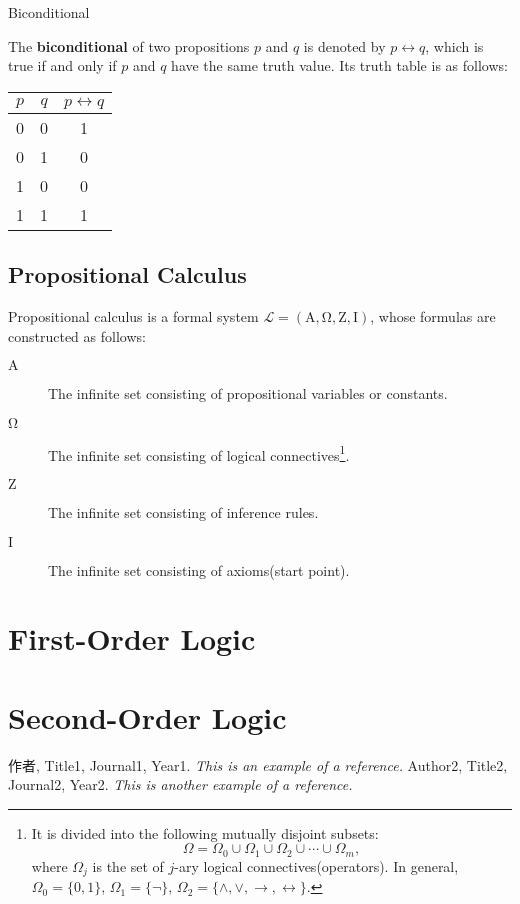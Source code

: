 \documentclass[11pt]{elegantbook}
\begin{document}
\begin{leftbarTitle}{Biconditional}\end{leftbarTitle}
The \textbf{biconditional} of two propositions \(p\) and \(q\) is denoted by \(p \leftrightarrow q\),
which is true if and only if \(p\) and \(q\) have the same truth value.
Its truth table is as follows:
\begin{center}
\begin{tabular}{ccc}
\toprule
$p$ & $q$ & $p \leftrightarrow q$ \\ %
\midrule
0 & 0 & 1 \\ %
0 & 1 & 0 \\ %
1 & 0 & 0 \\ %
1 & 1 & 1 \\ %
\bottomrule
\end{tabular}
\end{center}

\section{Propositional Calculus}
Propositional calculus is a formal system \(\mathcal{L} = \left( \mathrm{A}, \mathrm{\Omega}, \mathrm{Z}, \mathrm{I} \right) \),
whose formulas are constructed as follows:
\begin{description}
    \item[\({\mathrm{A}}\)]  The infinite set consisting of propositional variables or constants.
    \item[\({\mathrm{\Omega}}\)]  The infinite set consisting of logical connectives\footnote{
        It is divided into the following mutually disjoint subsets:
        \[
        \Omega = \Omega_{0} \cup \Omega_{1} \cup \Omega_{2} \cup \cdots \cup \Omega_{m},
        \]
        where \(\Omega_{j}\) is the set of \(j\)-ary logical connectives(operators).
        In general, \(\Omega_{0}=\{ 0,1 \}\), \(\Omega_{1}=\{ \neg \}\), 
        \(\Omega_{2}=\{ \land, \lor, \to, \leftrightarrow \}\).
    }.
    \item[\({\mathrm{Z}}\)]  The infinite set consisting of inference rules.
    \item[\({\mathrm{I}}\)]  The infinite set consisting of axioms(start point).
\end{description}

\chapter{First-Order Logic}

\chapter{Second-Order Logic}


\begin{thebibliography}{99} 
 作者, Title1, Journal1, Year1. \emph{ This is an example of a reference.}
 Author2, Title2, Journal2, Year2. \emph{ This is another example of a reference.}
\end{thebibliography}
\end{document}
